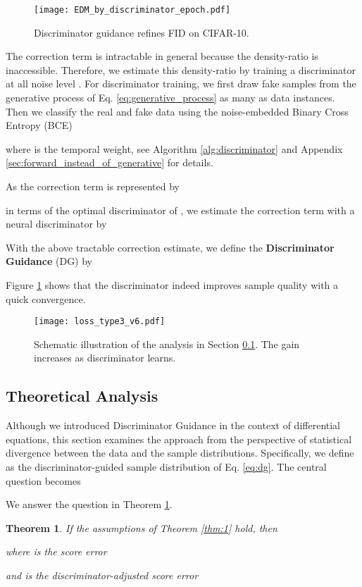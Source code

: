 \documentclass{article}
\theoremstyle{plain}
\newtheorem{theorem}{Theorem}\newtheorem{proposition}{Proposition}
\theoremstyle{definition}
\theoremstyle{remark}
\begin{document}
\begin{figure}[t]
	\centering
	\texttt{[image: EDM\_by\_discriminator\_epoch.pdf]}
	\vskip -0.1in
	\caption{Discriminator guidance refines FID on CIFAR-10.}
	\label{fig:discriminator_training}
\end{figure}

The correction term  is intractable in general because the density-ratio  is inaccessible. Therefore, we estimate this density-ratio by training a discriminator at all noise level . For discriminator training, we first draw fake samples from the generative process of Eq. \eqref{eq:generative_process} as many as data instances. Then we classify the real and fake data using the noise-embedded Binary Cross Entropy (BCE)

where  is the temporal weight, see Algorithm \ref{alg:discriminator} and Appendix \ref{sec:forward_instead_of_generative} for details.

As the correction term is represented by

in terms of the optimal discriminator  of , we estimate the correction term  with a neural discriminator  by

With the above tractable correction estimate, we define the \textbf{Discriminator Guidance} (DG) by

Figure \ref{fig:discriminator_training} shows that the discriminator indeed improves sample quality with a quick convergence. 

\begin{figure}[t]
	\centering
	\texttt{[image: loss\_type3\_v6.pdf]}
	\caption{Schematic illustration of the analysis in Section \ref{sec:theory}. The gain increases as discriminator learns.}
	\label{fig:loss_visualization}
\end{figure}
\subsection{Theoretical Analysis}\label{sec:theory}
Although we introduced Discriminator Guidance in the context of differential equations, this section examines the approach from the perspective of statistical divergence between the data and the sample distributions. Specifically, we define  as the discriminator-guided sample distribution of Eq. \eqref{eq:dg}. The central question becomes

We answer the question in Theorem \ref{thm:2}. 
\begin{theorem}\label{thm:2}
	If the assumptions of Theorem \ref{thm:1} hold, then
	
	where  is the score error
	
	and  is the discriminator-adjusted score error
	
\end{theorem}
\end{document}
